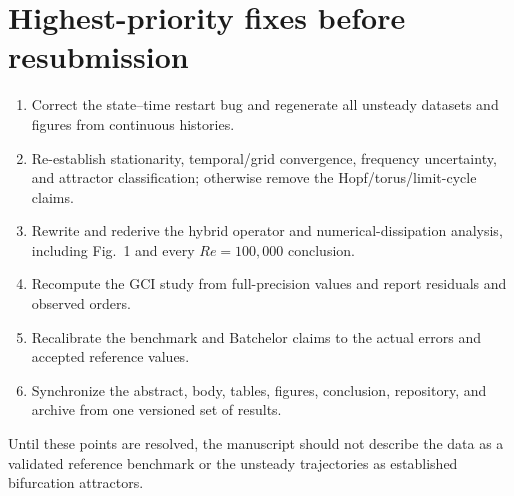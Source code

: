 \documentclass[11pt]{article}
\begin{document}
\section*{Highest-priority fixes before resubmission}

\begin{enumerate}[leftmargin=*]
  \item Correct the state--time restart bug and regenerate all unsteady datasets and figures from continuous histories.
  \item Re-establish stationarity, temporal/grid convergence, frequency uncertainty, and attractor classification; otherwise remove the Hopf/torus/limit-cycle claims.
  \item Rewrite and rederive the hybrid operator and numerical-dissipation analysis, including Fig.~1 and every $Re=100{,}000$ conclusion.
  \item Recompute the GCI study from full-precision values and report residuals and observed orders.
  \item Recalibrate the benchmark and Batchelor claims to the actual errors and accepted reference values.
  \item Synchronize the abstract, body, tables, figures, conclusion, repository, and archive from one versioned set of results.
\end{enumerate}

Until these points are resolved, the manuscript should not describe the data as a validated reference benchmark or the unsteady trajectories as established bifurcation attractors.
\end{document}

